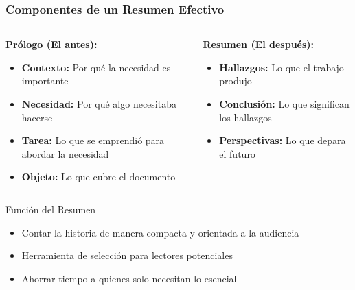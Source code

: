 \documentclass{beamer}
\begin{document}
\begin{frame}
\frametitle{Componentes de un Resumen Efectivo}

\begin{columns}[T]
\begin{column}{0.48\textwidth}
\textbf{Prólogo (El antes):}
\begin{itemize}
    \item \textbf{Contexto:} Por qué la necesidad es importante
    \item \textbf{Necesidad:} Por qué algo necesitaba hacerse
    \item \textbf{Tarea:} Lo que se emprendió para abordar la necesidad
    \item \textbf{Objeto:} Lo que cubre el documento
\end{itemize}
\end{column}

\begin{column}{0.48\textwidth}
\textbf{Resumen (El después):}
\begin{itemize}
    \item \textbf{Hallazgos:} Lo que el trabajo produjo
    \item \textbf{Conclusión:} Lo que significan los hallazgos
    \item \textbf{Perspectivas:} Lo que depara el futuro
\end{itemize}
\end{column}
\end{columns}

\vspace{0.1cm}
\begin{block}{Función del Resumen}
\begin{itemize}
    \item Contar la historia de manera compacta y orientada a la audiencia
    \item Herramienta de selección para lectores potenciales
    \item Ahorrar tiempo a quienes solo necesitan lo esencial
\end{itemize}
\end{block}
\end{frame}
\end{document}

